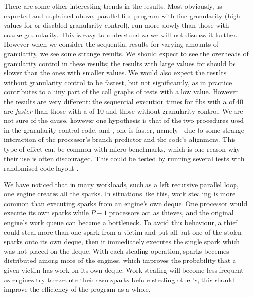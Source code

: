 There are some other interesting trends in the results.
Most obviously,
as expected and explained above,
parallel fibs program with fine granularity
(high values for \Depth or disabled granularity control),
run more slowly than those with coarse granularity.
This is easy to understand so we will not discuss it further.
However
when we consider the sequential results for varying amounts of granularity,
we see some strange results.
We should expect to see the overheads of granularity control in these
results;
the results with large values for \Depth should be slower than the ones with
smaller values.
We would also expect the results without granularity control to be fastest,
but not significantly,
as in practice \fibsgc contributes to a tiny part of the call graphs of tests
with a low \Depth value.
However the results are very different:
the sequential execution times for fibs with a \Depth of 40
are \emph{faster} than those with a \Depth of 10
and those without granularity control.
We are not sure of the cause,
however one hypothesis is that of the two procedures used in the granularity control
code,
\fibsseq and \fibsgc,
one is faster, namely \fibsgc, due to
some strange interaction of the processor's branch predictor and the code's
alignment.
This type of effect can be common with micro-benchmarks,
which is one reason why their use is often discouraged.
This could be tested by running several tests with randomised code layout
\citep{curtsinger:2012:stabilizer}.

We have noticed that in many workloads,
such as a left recursive parallel loop,
one engine creates all the sparks.
In situations like this,
work stealing is more common than executing sparks from an engine's own
deque.
One processor would execute its own sparks while $P - 1$ processors act as
thieves,
and the original engine's work queue can become a bottleneck.
To avoid this behaviour,
a thief could steal more than one spark from a victim and put all but one of
the stolen sparks
onto its own deque, then it immediately executes the single spark which was
not placed on the deque.
With each stealing operation,
sparks becomes distributed among more of the engines,
which improves the probability that a given victim has work on its own deque.
Work stealing will become less frequent as engines try to execute their own
sparks before stealing other's,
this should improve the efficiency of the program as a whole.

